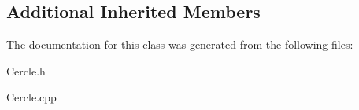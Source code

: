 \subsection*{Additional Inherited Members}


The documentation for this class was generated from the following files\+:\begin{DoxyCompactItemize}
\item 
Cercle.\+h\item 
Cercle.\+cpp\end{DoxyCompactItemize}
